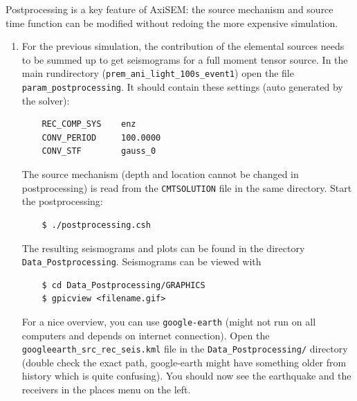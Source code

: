 \documentclass{article}
\begin{document}
Postprocessing is a key feature of AxiSEM: the source mechanism and source time function
can be modified without redoing the more expensive simulation.

\begin{enumerate}
    \item For the previous simulation, the contribution of the elemental sources needs
    to be summed up to get seismograms for a full moment tensor source. In the
    main rundirectory (\verb|prem_ani_light_100s_event1|) open the file
    \verb|param_postprocessing|. It should contain these settings (auto generated by the
    solver):
    \begin{verbatim}
    REC_COMP_SYS    enz
    CONV_PERIOD     100.0000
    CONV_STF        gauss_0
    \end{verbatim}
    The source mechanism (depth and location cannot be changed in postprocessing) is read
    from the \verb|CMTSOLUTION| file in the same directory. Start the postprocessing:
    \begin{verbatim}
    $ ./postprocessing.csh
    \end{verbatim}
    The resulting seismograms and plots can be found in the directory
    \verb|Data_Postprocessing|. Seismograms can be viewed with
    \begin{verbatim}
    $ cd Data_Postprocessing/GRAPHICS
    $ gpicview <filename.gif>
    \end{verbatim}
    For a nice overview, you can use \verb|google-earth| (might not run on all computers
    and depends on internet connection). Open the \verb|googleearth_src_rec_seis.kml| file
    in the \verb|Data_Postprocessing/| directory (double check the exact path,
    google-earth might have something older from history which is quite confusing).
    You should now see the earthquake and the receivers in the places menu on the left.


\end{enumerate}
\end{document}
